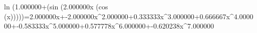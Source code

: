 ln (1.000000+(sin (2.000000x \cdot (cos (x)))))=2.000000x+-2.000000x^{2.000000}+0.333333x^{3.000000}+0.666667x^{4.000000}+-0.583333x^{5.000000}+0.577778x^{6.000000}+-0.620238x^{7.000000}